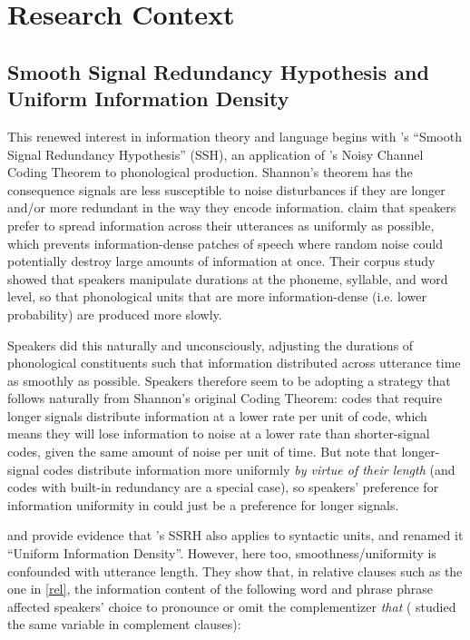 \documentclass[12pt]{article}
\begin{document}
\section{Research Context}
\label{context}

\subsection{Smooth Signal Redundancy Hypothesis and Uniform Information Density}

This renewed interest in information theory and language begins with \citet{aylettturk2004}'s ``Smooth Signal Redundancy Hypothesis'' (SSH), an application of \citet{shannon1948}'s Noisy Channel Coding Theorem to phonological production. Shannon's theorem has the consequence signals are less susceptible to noise disturbances if they are longer and/or more redundant in the way they encode information. \citet{aylettturk2004} claim that speakers prefer to spread information across their utterances as uniformly as possible, which prevents information-dense patches of speech where random noise could potentially destroy large amounts of information at once. Their corpus study showed that speakers manipulate durations at the phoneme, syllable, and word level, so that phonological units that are more information-dense (i.e. lower probability) are produced more slowly.

Speakers did this naturally and unconsciously, adjusting the durations of phonological constituents such that information distributed across utterance time as smoothly as possible. Speakers therefore seem to be adopting a strategy that follows naturally from Shannon's original Coding Theorem: codes that require longer signals distribute information at a lower rate per unit of code, which means they will lose information to noise at a lower rate than shorter-signal codes, given the same amount of noise per unit of time. But note that longer-signal codes distribute information more uniformly \textsl{by virtue of their length} (and codes with built-in redundancy are a special case), so speakers' preference for information uniformity in \citet{aylettturk2004} could just be a preference for longer signals.

\citet{levyjaeger2007} and \citet{jaeger2010} provide evidence that \citet{aylettturk2004}'s SSRH also applies to syntactic units, and renamed it ``Uniform Information Density''. However, here too, smoothness/uniformity is confounded with utterance length.  They show that, in relative clauses such as the one in \ref{rel}, the information content of the following word and phrase phrase affected speakers' choice to pronounce or omit the complementizer \textsl{that} (\citealt{jaeger2010} studied the same variable in complement clauses):
\end{document}
